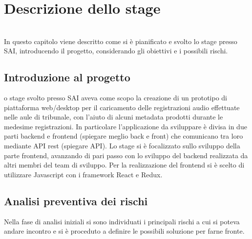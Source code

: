 
\chapter{Descrizione dello stage}
\label{cap:descrizione-stage}

\\

In questo capitolo viene descritto come si è pianificato e svolto lo stage presso SAI, introducendo il progetto, considerando gli obiettivi e i possibili rischi.

\section{Introduzione al progetto}

o stage svolto presso SAI aveva come scopo la creazione di un prototipo di piattaforma web/desktop per il caricamento delle registrazioni audio effettuate nelle aule di tribunale, con l'aiuto di alcuni metadata prodotti durante le medesime registrazioni. In particolare l'applicazione da sviluppare è divisa in due parti backend e frontend (spiegare meglio back e front) che comunicano tra loro mediante API rest (spiegare API). Lo stage si è focalizzato sullo sviluppo della parte frontend, avanzando di pari passo con lo sviluppo del  backend realizzata da altri membri del team di sviluppo. Per la realizzazione del frontend si è scelto di utilizzare Javascript con i framework React e Redux. 

\section{Analisi preventiva dei rischi}

Nella fase di analisi iniziali si sono individuati i principali rischi a cui si poteva andare incontro e si è proceduto a definire le possibili soluzione per farne fronte.\\

